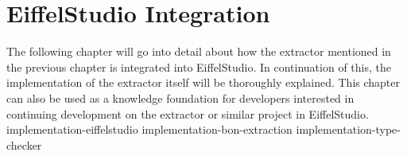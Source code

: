 \chapter{EiffelStudio Integration}
\label{eiffelstudio-integration}
The following chapter will go into detail about how the \bon{} extractor mentioned in the previous chapter is integrated into EiffelStudio. In continuation of this, the implementation of the extractor itself will be thoroughly explained. This chapter can also be used as a knowledge foundation for developers interested in continuing development on the \bon{} extractor or similar project in EiffelStudio.
{implementation-eiffelstudio}
{implementation-bon-extraction}
{implementation-type-checker}